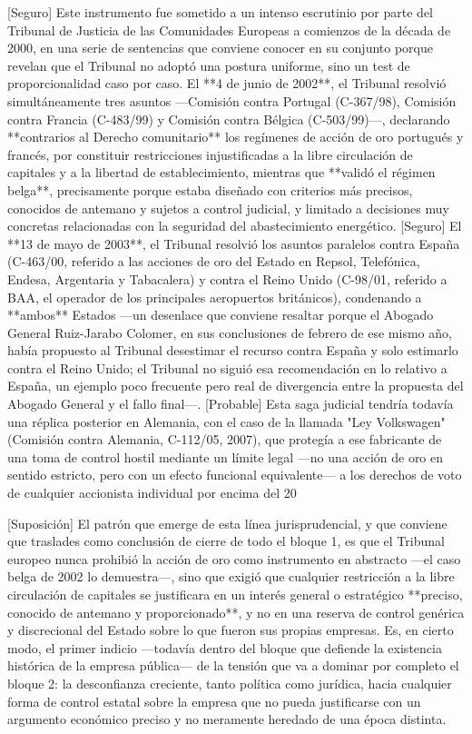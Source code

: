 \documentclass[10pt,a4paper]{article}
\begin{document}
[Seguro] Este instrumento fue sometido a un intenso escrutinio por parte del Tribunal de Justicia de las Comunidades Europeas a comienzos de la década de 2000, en una serie de sentencias que conviene conocer en su conjunto porque revelan que el Tribunal no adoptó una postura uniforme, sino un test de proporcionalidad caso por caso. El **4 de junio de 2002**, el Tribunal resolvió simultáneamente tres asuntos —Comisión contra Portugal (C-367/98), Comisión contra Francia (C-483/99) y Comisión contra Bélgica (C-503/99)—, declarando **contrarios al Derecho comunitario** los regímenes de acción de oro portugués y francés, por constituir restricciones injustificadas a la libre circulación de capitales y a la libertad de establecimiento, mientras que **validó el régimen belga**, precisamente porque estaba diseñado con criterios más precisos, conocidos de antemano y sujetos a control judicial, y limitado a decisiones muy concretas relacionadas con la seguridad del abastecimiento energético. [Seguro] El **13 de mayo de 2003**, el Tribunal resolvió los asuntos paralelos contra España (C-463/00, referido a las acciones de oro del Estado en Repsol, Telefónica, Endesa, Argentaria y Tabacalera) y contra el Reino Unido (C-98/01, referido a BAA, el operador de los principales aeropuertos británicos), condenando a **ambos** Estados —un desenlace que conviene resaltar porque el Abogado General Ruiz-Jarabo Colomer, en sus conclusiones de febrero de ese mismo año, había propuesto al Tribunal desestimar el recurso contra España y solo estimarlo contra el Reino Unido; el Tribunal no siguió esa recomendación en lo relativo a España, un ejemplo poco frecuente pero real de divergencia entre la propuesta del Abogado General y el fallo final—. [Probable] Esta saga judicial tendría todavía una réplica posterior en Alemania, con el caso de la llamada "Ley Volkswagen" (Comisión contra Alemania, C-112/05, 2007), que protegía a ese fabricante de una toma de control hostil mediante un límite legal —no una acción de oro en sentido estricto, pero con un efecto funcional equivalente— a los derechos de voto de cualquier accionista individual por encima del 20%

[Suposición] El patrón que emerge de esta línea jurisprudencial, y que conviene que traslades como conclusión de cierre de todo el bloque 1, es que el Tribunal europeo nunca prohibió la acción de oro como instrumento en abstracto —el caso belga de 2002 lo demuestra—, sino que exigió que cualquier restricción a la libre circulación de capitales se justificara en un interés general o estratégico **preciso, conocido de antemano y proporcionado**, y no en una reserva de control genérica y discrecional del Estado sobre lo que fueron sus propias empresas. Es, en cierto modo, el primer indicio —todavía dentro del bloque que defiende la existencia histórica de la empresa pública— de la tensión que va a dominar por completo el bloque 2: la desconfianza creciente, tanto política como jurídica, hacia cualquier forma de control estatal sobre la empresa que no pueda justificarse con un argumento económico preciso y no meramente heredado de una época distinta.
\end{document}
